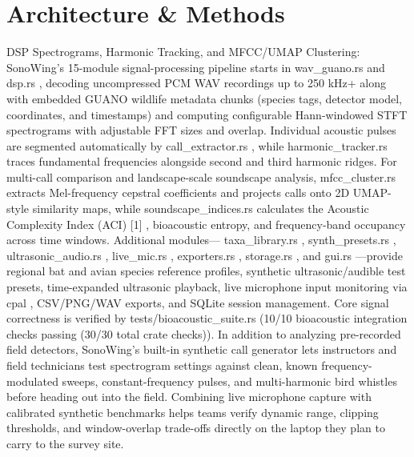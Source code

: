 \documentclass[10pt,letterpaper]{article}
\begin{document}
\section{Architecture \& Methods}
DSP Spectrograms, Harmonic Tracking, and MFCC/UMAP Clustering: SonoWing's 15-module signal-processing pipeline starts in wav\_guano.rs and dsp.rs , decoding uncompressed PCM WAV recordings up to 250 kHz+ along with embedded GUANO wildlife metadata chunks (species tags, detector model, coordinates, and timestamps) and computing configurable Hann-windowed STFT spectrograms with adjustable FFT sizes and overlap. Individual acoustic pulses are segmented automatically by call\_extractor.rs , while harmonic\_tracker.rs traces fundamental frequencies alongside second and third harmonic ridges. For multi-call comparison and landscape-scale soundscape analysis, mfcc\_cluster.rs extracts Mel-frequency cepstral coefficients and projects calls onto 2D UMAP-style similarity maps, while soundscape\_indices.rs calculates the Acoustic Complexity Index (ACI) [1] , bioacoustic entropy, and frequency-band occupancy across time windows. Additional modules--- taxa\_library.rs , synth\_presets.rs , ultrasonic\_audio.rs , live\_mic.rs , exporters.rs , storage.rs , and gui.rs ---provide regional bat and avian species reference profiles, synthetic ultrasonic/audible test presets, time-expanded ultrasonic playback, live microphone input monitoring via cpal , CSV/PNG/WAV exports, and SQLite session management. Core signal correctness is verified by tests/bioacoustic\_suite.rs (10/10 bioacoustic integration checks passing (30/30 total crate checks)). In addition to analyzing pre-recorded field detectors, SonoWing's built-in synthetic call generator lets instructors and field technicians test spectrogram settings against clean, known frequency-modulated sweeps, constant-frequency pulses, and multi-harmonic bird whistles before heading out into the field. Combining live microphone capture with calibrated synthetic benchmarks helps teams verify dynamic range, clipping thresholds, and window-overlap trade-offs directly on the laptop they plan to carry to the survey site.
\end{document}
